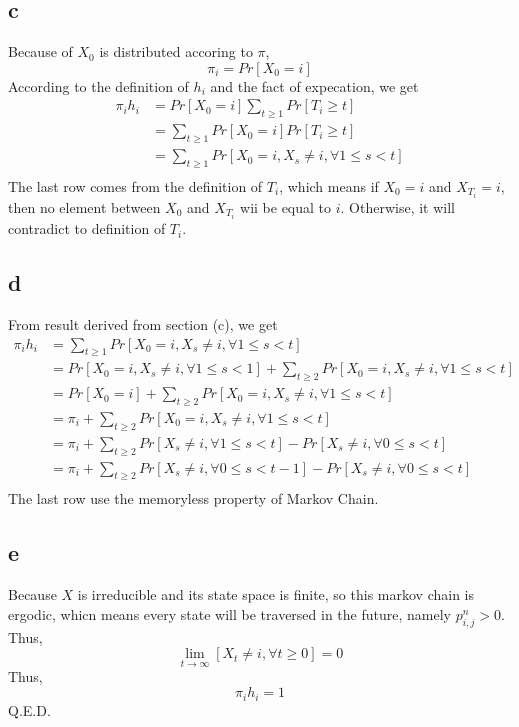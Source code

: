 \documentclass{article}
\begin{document}
	\subsection{c}
	Because of $X_0$ is distributed accoring to $\pi$,
	$$
	\pi_i=Pr[X_0=i]
	$$
	According to the definition of $h_i$ and the fact of expecation, we get
	$$
	\begin{aligned}
	\pi_ih_i &= Pr[X_0=i]\sum_{t \geq 1}Pr[T_i \geq t]\\
			 &= \sum_{t \geq 1}Pr[X_0=i]Pr[T_i \geq t]\\
			 &= \sum_{t \geq 1}Pr[X_0=i, X_s \neq i, \forall 1 \leq s < t]\\
	\end{aligned}
	$$
	The last row comes from the definition of $T_i$, which means if $X_0=i$ and $X_{T_i}=i$, then no element between $X_0$ and $X_{T_i}$ wii be equal to $i$. Otherwise, it will contradict to definition of $T_i$.
	\subsection{d}
	From result derived from section (c), we get
	$$
	\begin{aligned}
	\pi_ih_i &= \sum_{t \geq 1}Pr[X_0=i, X_s \neq i, \forall 1 \leq s < t]\\
			 &= Pr[X_0=i, X_s \neq i, \forall 1 \leq s < 1] + \sum_{t \geq 2}Pr[X_0=i, X_s \neq i, \forall 1 \leq s < t]\\
			 &= Pr[X_0=i] + \sum_{t \geq 2}Pr[X_0=i, X_s \neq i, \forall 1 \leq s < t]\\
			 &= \pi_i + \sum_{t \geq 2}Pr[X_0=i, X_s \neq i, \forall 1 \leq s < t]\\
			 &= \pi_i + \sum_{t \geq 2}Pr[X_s \neq i, \forall 1 \leq s < t]-Pr[X_s \neq i, \forall 0 \leq s < t]\\
			 &= \pi_i + \sum_{t \geq 2}Pr[X_s \neq i, \forall 0 \leq s < t-1]-Pr[X_s \neq i, \forall 0 \leq s < t]\\
	\end{aligned}
	$$
	The last row use the memoryless property of Markov Chain.
	\subsection{e}
	Because $X$ is irreducible and its state space is finite, so this markov chain is ergodic, whicn means every state will be traversed in the future, namely $p_{i,j}^n>0$. Thus,
	$$
	\lim_{t \to \infty}[X_t \neq i, \forall t \geq 0] = 0
	$$
	Thus,
	$$
	\pi_i h_i = 1
	$$
	Q.E.D.
\end{document}

